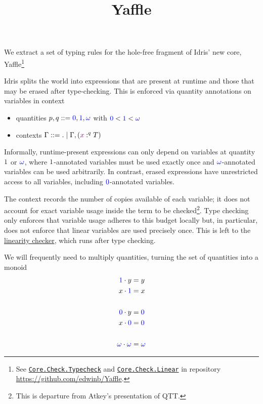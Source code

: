 \documentclass{article}
\title{Yaffle}
\newcommand{\OF}{:}
\newcommand{\OFq}[1]{\OF^{#1}}
\newcommand{\EMPTY}{.}
\newcommand{\zero}{{\textcolor{type}{0}}}
\newcommand{\one}{{\textcolor{type}{1}}}
\newcommand{\any}{{\textcolor{type}{\omega}}}
\newcommand{\multQ}[2]{{#1} \cdot {#2}}
\newcommand{\name}[1]{{\textcolor{neutral}{#1}}}
\begin{document}
\maketitle

We extract a set of typing rules for the hole-free fragment of Idris' new core, Yaffle\footnote{See \href{https://github.com/edwinb/Yaffle/blob/main/src/Core/Check/Typecheck.idr}{{\texttt{Core.Check.Typecheck}}} and \href{https://github.com/edwinb/Yaffle/blob/main/src/Core/Check/Linear.idr}{\texttt{Core.Check.Linear}} in repository \url{https://github.com/edwinb/Yaffle}.}

Idris splits the world into expressions that are present at runtime and those that may be erased after type-checking. This is enforced via quantity annotations on variables in context
\begin{itemize}
\item quantities $p, q \mathrel{\text{::=}} \zero, \one, \any$ with $\zero < \one < \any$
\item contexts $\Gamma \mathrel{\text{::=}} \EMPTY \mid \Gamma, (\name x \OFq q T)$
\end{itemize}
Informally, runtime-present expressions can only depend on variables at quantity $\one$ or $\any$, where $\one$-annotated variables must be used exactly once and $\any$-annotated variables can be used arbitrarily. In contrast, erased expressions have unrestricted access to all variables, including $\zero$-annotated variables.

The context records the number of copies available of each variable; it does not account for exact variable usage inside the term to be checked\footnote{This is departure from Atkey's presentation of QTT\cite{Atkey2018}.}. Type checking only enforces that variable usage adheres to this budget locally but, in particular, does not enforce that linear variables are used precisely once. This is left to the \hyperref[sec:linearity_checking]{linearity checker}, which runs after type checking.

We will frequently need to multiply quantities, turning the set of  quantities into a monoid
\begin{align*}
\multQ \one y &= y\\
\multQ x \one &= x\\\\
\multQ \zero y &= \zero\\
\multQ x \zero &= \zero\\\\
\multQ \any \any &= \any
\end{align*}
\end{document}
